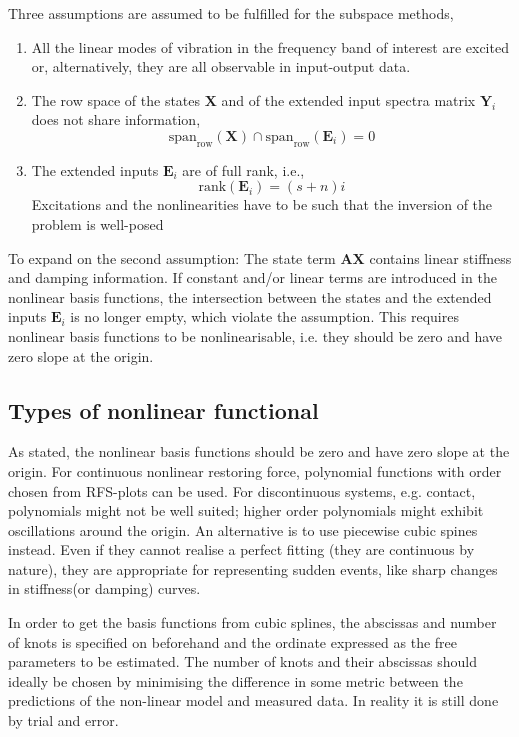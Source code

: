 Three assumptions are assumed to be fulfilled for the subspace methods,
\begin{enumerate}
\item All the linear modes of vibration in the frequency band of interest are
  excited or, alternatively, they are all observable in input-output data.
\item The row space of the states $\bm X$ and of the extended input spectra
  matrix $\bm Y_i$ does not share information,
  \begin{equation*}
    \text{span}_{\text{row}} (\bm X) \cap \text{span}_{\text{row}}(\bm E_i) = 0
  \end{equation*}
\item The extended inputs $\bm E_i$ are of full rank, i.e.,
  \begin{equation*}
    \text{rank}(\bm E_i) = (s+n) i
  \end{equation*}
  Excitations and the nonlinearities have to be such that the inversion of the
  problem is well-posed
\end{enumerate}

To expand on the second assumption:
The state term $\bm A \bm X$ contains linear stiffness and damping information.
If constant and/or linear terms are introduced in the nonlinear basis functions,
the intersection between the states and the extended inputs $\bm E_i$ is no
longer empty, which violate the assumption.
This requires nonlinear basis functions to be nonlinearisable, i.e. they should
be zero and have zero slope at the origin.

\FloatBarrier


\subsection{Types of nonlinear functional}
\label{sec:fnsi_functional}


As stated, the nonlinear basis functions should be zero and have zero slope at
the origin. For continuous nonlinear restoring force, polynomial functions with
order chosen from RFS-plots can be used. For discontinuous systems, e.g. contact,
polynomials might not be well suited; higher order polynomials might
exhibit oscillations around the origin. An alternative is to use piecewise cubic
spines instead. Even if they cannot realise a perfect fitting (they are
continuous by nature), they are appropriate for representing sudden events,
like sharp changes in stiffness(or damping) curves.

In order to get the basis functions from cubic splines, the abscissas and number
of  knots
is specified on beforehand and the ordinate expressed as the free parameters to
be estimated.
The number of knots and their abscissas should ideally be chosen by minimising
the difference in some metric between the predictions of the non-linear model
and measured data. In reality it is still done by trial and error.

